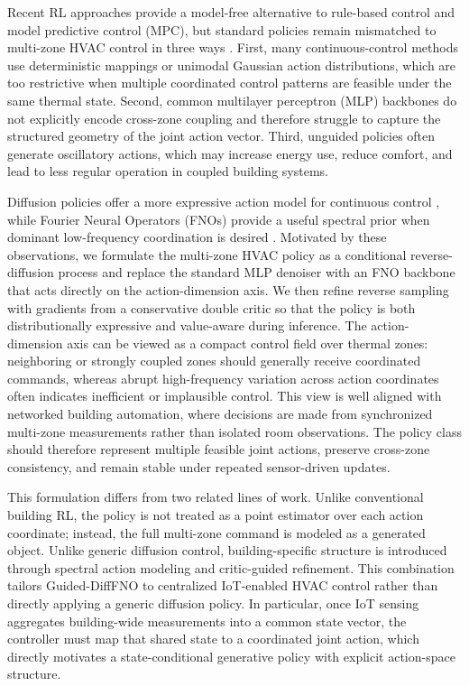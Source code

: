 \documentclass[conference]{IEEEtran}
\theoremstyle{nonumberplain}
\theoremstyle{plain}
\begin{document}
Recent RL approaches provide a model-free alternative to rule-based control and model predictive control (MPC), but standard policies remain mismatched to multi-zone HVAC control in three ways \cite{drgovna2020all,wei2017deep,biemann2021experimental,mason2019review,alsayed2024hvacreview}. First, many continuous-control methods use deterministic mappings or unimodal Gaussian action distributions, which are too restrictive when multiple coordinated control patterns are feasible under the same thermal state. Second, common multilayer perceptron (MLP) backbones do not explicitly encode cross-zone coupling and therefore struggle to capture the structured geometry of the joint action vector. Third, unguided policies often generate oscillatory actions, which may increase energy use, reduce comfort, and lead to less regular operation in coupled building systems.

Diffusion policies offer a more expressive action model for continuous control \cite{chi2025diffusion,janner2022planning,wang2023diffusion}, while Fourier Neural Operators (FNOs) provide a useful spectral prior when dominant low-frequency coordination is desired \cite{li2021fourier,qin2024toward,liu2024mitigating}. Motivated by these observations, we formulate the multi-zone HVAC policy as a conditional reverse-diffusion process and replace the standard MLP denoiser with an FNO backbone that acts directly on the action-dimension axis. We then refine reverse sampling with gradients from a conservative double critic so that the policy is both distributionally expressive and value-aware during inference.
The action-dimension axis can be viewed as a compact control field over thermal zones: neighboring or strongly coupled zones should generally receive coordinated commands, whereas abrupt high-frequency variation across action coordinates often indicates inefficient or implausible control. This view is well aligned with networked building automation, where decisions are made from synchronized multi-zone measurements rather than isolated room observations. The policy class should therefore represent multiple feasible joint actions, preserve cross-zone consistency, and remain stable under repeated sensor-driven updates.

This formulation differs from two related lines of work. Unlike conventional building RL, the policy is not treated as a point estimator over each action coordinate; instead, the full multi-zone command is modeled as a generated object. Unlike generic diffusion control, building-specific structure is introduced through spectral action modeling and critic-guided refinement. This combination tailors Guided-DiffFNO to centralized IoT-enabled HVAC control rather than directly applying a generic diffusion policy. In particular, once IoT sensing aggregates building-wide measurements into a common state vector, the controller must map that shared state to a coordinated joint action, which directly motivates a state-conditional generative policy with explicit action-space structure.
\end{document}

